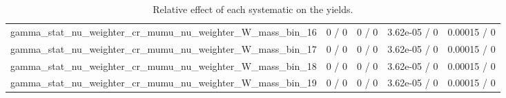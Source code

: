\documentclass[10pt]{article}
\begin{document}
\begin{table}[htbp]
\begin{center}
\begin{tabular}{|c|c|c|c|c|}
  gamma_stat_nu_weighter_cr_mumu_nu_weighter_W_mass_bin_16 & 0 / 0 & 0 / 0 & 3.62e-05 / 0 & 0.00015 / 0 \\ 
  gamma_stat_nu_weighter_cr_mumu_nu_weighter_W_mass_bin_17 & 0 / 0 & 0 / 0 & 3.62e-05 / 0 & 0.00015 / 0 \\ 
  gamma_stat_nu_weighter_cr_mumu_nu_weighter_W_mass_bin_18 & 0 / 0 & 0 / 0 & 3.62e-05 / 0 & 0.00015 / 0 \\ 
  gamma_stat_nu_weighter_cr_mumu_nu_weighter_W_mass_bin_19 & 0 / 0 & 0 / 0 & 3.62e-05 / 0 & 0.00015 / 0 \\ 
\hline 
\end{tabular} 
\caption{Relative effect of each systematic on the yields.} 
\end{center} 
\end{table} 
\end{document}

